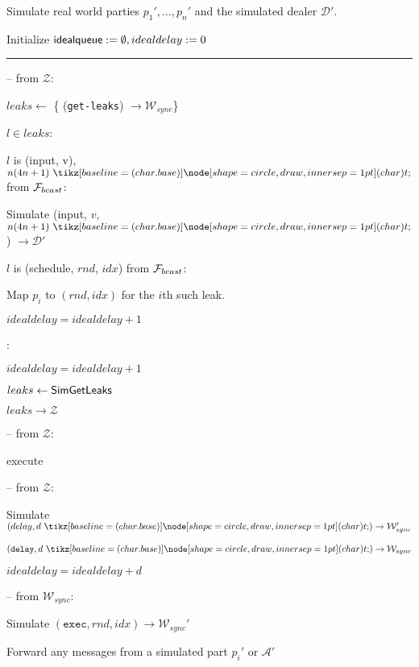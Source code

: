 \begin{bbox}[title={Simulator $\mathcal{S}_{bracha} (\mathcal{D}, \mathcal{P}, \Delta)$}]

Simulate real world parties $p_1',...,p_n'$ and the simulated dealer $\mathcal{D}'$.

Initialize ${\mathsf {idealqueue}} := \emptyset, idealdelay := 0$

\vspace{2mm} \hrule \vspace{2mm}

-- \OnInput {} from $\mathcal{Z}$:

	\qquad $leaks \leftarrow$ \{ \Send (\texttt{get-leaks}) $\rightarrow \mathcal{W}_{sync}$\}

	\qquad \For $l \in leaks$:

		\qqquad \If $l$ is (input, v), $n(4n+1) \token$ from $\mathcal{F}_{bcast}$:

			\qqqquad Simulate (input, $v$, $n(4n+1) \token$) $\rightarrow \mathcal{D}'$ 

		\qqquad \Else \If $l$ is (schedule, $rnd$, $idx$) from $\mathcal{F}_{bcast}$:

			\qqqquad Map $p_i$ to $(rnd,idx)$ for the $i$th such leak.

			\qqqquad $idealdelay = idealdelay + 1$

		\qqquad \Else:

			\qqqquad $idealdelay = idealdelay + 1$

	\qquad $leaks \leftarrow {\mathsf {SimGetLeaks}}$

	\qquad \Send $leaks \rightarrow \mathcal{Z}$

-- \OnInput {} from $\mathcal{Z}$:

	\qquad execute 

-- \OnInput {} from $\mathcal{Z}$:

	\qquad Simulate $(delay, d \token) \rightarrow \mathcal{W}_{sync}'$

	\qquad \Send $(\texttt{delay}, d \token) \rightarrow \mathcal{W}_{sync}$

	\qquad $idealdelay = idealdelay + d$

-- \OnInput {} from $\mathcal{W}_{sync}$:

	\qquad Simulate $(\texttt{exec}, rnd, idx) \rightarrow \mathcal{W}_{sync}'$

	\qquad Forward any messages from a simulated part $p_i'$ or $\mathcal{A}'$

\end{bbox}
